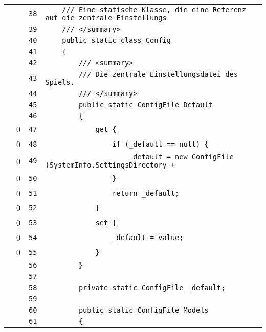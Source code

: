 \documentclass[a4paper,10pt]{article}
\begin{document}
\begin{longtable}[l]{lrrl}
\cellcolor{gray} &  & \verb~38~ & \verb~    /// Eine statische Klasse, die eine Referenz auf die zentrale Einstellungs~\\
\cellcolor{gray} &  & \verb~39~ & \verb~    /// </summary>~\\
\cellcolor{gray} &  & \verb~40~ & \verb~    public static class Config~\\
\cellcolor{gray} &  & \verb~41~ & \verb~    {~\\
\cellcolor{gray} &  & \verb~42~ & \verb~        /// <summary>~\\
\cellcolor{gray} &  & \verb~43~ & \verb~        /// Die zentrale Einstellungsdatei des Spiels.~\\
\cellcolor{gray} &  & \verb~44~ & \verb~        /// </summary>~\\
\cellcolor{gray} &  & \verb~45~ & \verb~        public static ConfigFile Default~\\
\cellcolor{gray} &  & \verb~46~ & \verb~        {~\\
\cellcolor{red} & 0 & \verb~47~ & \verb~            get {~\\
\cellcolor{red} & 0 & \verb~48~ & \verb~                if (_default == null) {~\\
\cellcolor{red} & 0 & \verb~49~ & \verb~                    _default = new ConfigFile (SystemInfo.SettingsDirectory + ~\\
\cellcolor{red} & 0 & \verb~50~ & \verb~                }~\\
\cellcolor{red} & 0 & \verb~51~ & \verb~                return _default;~\\
\cellcolor{red} & 0 & \verb~52~ & \verb~            }~\\
\cellcolor{red} & 0 & \verb~53~ & \verb~            set {~\\
\cellcolor{red} & 0 & \verb~54~ & \verb~                _default = value;~\\
\cellcolor{red} & 0 & \verb~55~ & \verb~            }~\\
\cellcolor{gray} &  & \verb~56~ & \verb~        }~\\
\cellcolor{gray} &  & \verb~57~ & \verb~~\\
\cellcolor{gray} &  & \verb~58~ & \verb~        private static ConfigFile _default;~\\
\cellcolor{gray} &  & \verb~59~ & \verb~~\\
\cellcolor{gray} &  & \verb~60~ & \verb~        public static ConfigFile Models~\\
\cellcolor{gray} &  & \verb~61~ & \verb~        {~\\

\end{longtable}
\end{document}
